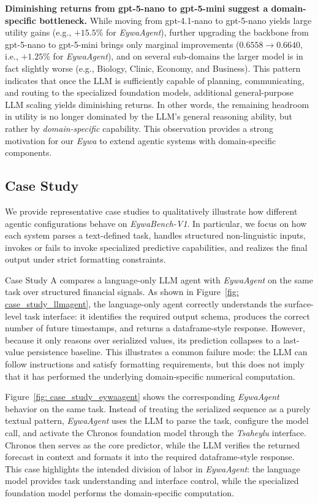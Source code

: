 \textbf{Diminishing returns from gpt-5-nano to gpt-5-mini suggest a domain-specific bottleneck.} While moving from gpt-4.1-nano to gpt-5-nano yields large utility gains (e.g., $+15.5\%$ for \textit{EywaAgent}), further upgrading the backbone from gpt-5-nano to gpt-5-mini brings only marginal improvements ($0.6558 \rightarrow 0.6640$, i.e., $+1.25\%$ for \textit{EywaAgent}), and on several sub-domains the larger model is in fact slightly worse (e.g., Biology, Clinic, Economy, and Business). This pattern indicates that once the LLM is sufficiently capable of planning, communicating, and routing to the specialized foundation models, additional general-purpose LLM scaling yields diminishing returns. In other words, the remaining headroom in utility is no longer dominated by the LLM's general reasoning ability, but rather by \emph{domain-specific} capability. This observation provides a strong motivation for our \textit{Eywa} to extend agentic systems with domain-specific components.


\subsection{Case Study}
\label{ap:case_study}


We provide representative case studies to qualitatively illustrate how different agentic configurations behave on \textit{EywaBench-V1}. In particular, we focus on how each system parses a text-defined task, handles structured non-linguistic inputs, invokes or fails to invoke specialized predictive capabilities, and realizes the final output under strict formatting constraints.

Case Study A compares a language-only LLM agent with \textit{EywaAgent} on the same task over structured financial signals. As shown in Figure~\ref{fig: case_study_llmagent}, the language-only agent correctly understands the surface-level task interface: it identifies the required output schema, produces the correct number of future timestamps, and returns a dataframe-style response. However, because it only reasons over serialized values, its prediction collapses to a last-value persistence baseline. This illustrates a common failure mode: the LLM can follow instructions and satisfy formatting requirements, but this does not imply that it has performed the underlying domain-specific numerical computation.

Figure~\ref{fig: case_study_eywaagent} shows the corresponding \textit{EywaAgent} behavior on the same task. Instead of treating the serialized sequence as a purely textual pattern, \textit{EywaAgent} uses the LLM to parse the task, configure the model call, and activate the Chronos foundation model through the \textit{Tsaheylu} interface. Chronos then serves as the core predictor, while the LLM verifies the returned forecast in context and formats it into the required dataframe-style response. This case highlights the intended division of labor in \textit{EywaAgent}: the language model provides task understanding and interface control, while the specialized foundation model performs the domain-specific computation.

